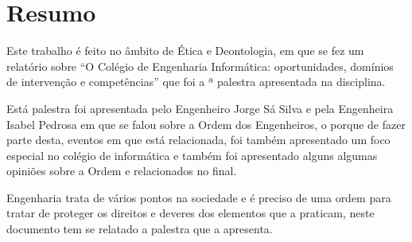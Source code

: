 \section{Resumo}
Este trabalho é feito no âmbito de Ética e Deontologia, em que se fez um relatório sobre ``O Colégio de Engenharia Informática: oportunidades, domínios de intervenção e competências'' que foi a \palestranumero ª palestra apresentada na disciplina.

Está palestra foi apresentada pelo Engenheiro Jorge Sá Silva  e pela Engenheira Isabel Pedrosa em que se falou sobre a Ordem dos Engenheiros, o porque de fazer parte desta, eventos em que está relacionada, foi também apresentado um foco especial no colégio de informática e também foi apresentado alguns algumas opiniões sobre a Ordem e relacionados no final.


\myemptypage{}


Engenharia trata de vários pontos na sociedade e é preciso de uma ordem para tratar de proteger os direitos e deveres dos elementos que a praticam, neste documento tem se relatado a palestra que a apresenta.